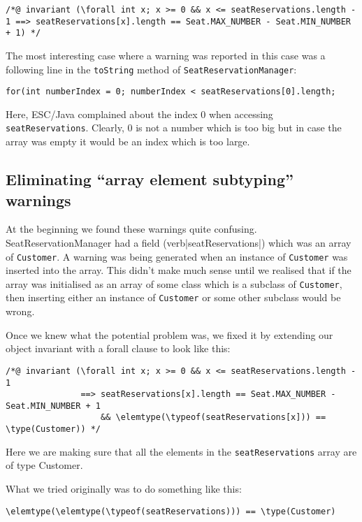 \documentclass[11pt]{article}
\begin{document}
\noindent
\begin{verbatim}
/*@ invariant (\forall int x; x >= 0 && x <= seatReservations.length - 1 ==> seatReservations[x].length == Seat.MAX_NUMBER - Seat.MIN_NUMBER + 1) */
\end{verbatim}

The most interesting case where a warning was reported in this case was a following line in the \verb|toString| method of \verb|SeatReservationManager|:

\begin{verbatim}
for(int numberIndex = 0; numberIndex < seatReservations[0].length;
\end{verbatim}

Here, ESC/Java complained about the index 0 when accessing \verb|seatReservations|. Clearly, 0 is not a number which is too big but in case the array was empty it would be an index which is too large.

\subsection{Eliminating ``array element subtyping'' warnings}

At the beginning we found these warnings quite confusing. SeatReservationManager had a field (verb|seatReservations|) which was an array of \verb|Customer|. A warning was being generated when an instance of \verb|Customer| was inserted into the array. This didn't make much sense until we realised that if the array was initialised as an array of some class which is a subclass of \verb|Customer|, then inserting either an instance of \verb|Customer| or some other subclass would be wrong.

Once we knew what the potential problem was, we fixed it by extending our object invariant with a forall clause to look like this:

\noindent
\begin{verbatim}
/*@ invariant (\forall int x; x >= 0 && x <= seatReservations.length - 1
               ==> seatReservations[x].length == Seat.MAX_NUMBER - Seat.MIN_NUMBER + 1
                   && \elemtype(\typeof(seatReservations[x])) == \type(Customer)) */
\end{verbatim}

Here we are making sure that all the elements in the \verb|seatReservations| array are of type Customer.

What we tried originally was to do something like this:

\begin{verbatim}
\elemtype(\elemtype(\typeof(seatReservations))) == \type(Customer)
\end{verbatim}
\end{document}
